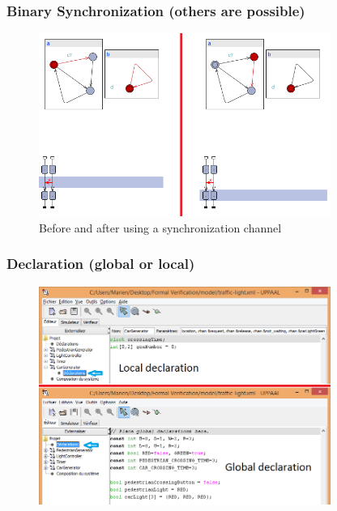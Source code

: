 \documentclass{bredelebeamer}
\begin{document}
\begin{frame}
	\frametitle{Binary Synchronization (others are possible)}
	\begin{figure}
    	\centering
    	\includegraphics[width = 0.85\textwidth]{sync_before_after.png}
    	\caption{Before and after using a synchronization channel}
  	\end{figure}
\end{frame}


\begin{frame}
	\frametitle{Declaration (global or local)}
	\begin{figure}
    	\centering
    	\includegraphics[width = 0.85\textwidth]{uppaal_main_window_declaration.png}
  	\end{figure}
\end{frame}
\end{document}
